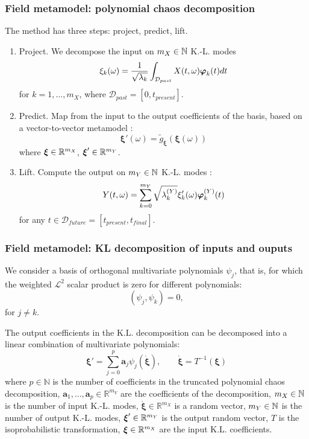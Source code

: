 \documentclass[10pt]{beamer}
\begin{document}
\begin{frame}
\frametitle{Field metamodel: polynomial chaos decomposition}

The method has three steps: project, predict, lift.
\begin{enumerate}
\item Project. We decompose the input on $m_X \in \mathbb{N}$ K.-L. modes 
$$
\xi_k(\omega) = \frac{1}{\sqrt{\lambda_k}} \int_{\mathcal{D}_{past}} X(t, \omega) {\boldsymbol \varphi}_k(t) dt
$$
for $k = 1, \ldots, m_X$, where $\mathcal{D}_{past} = [0, t_{present}]$.

\item Predict. Map from the input to the output coefficients of the basis, based 
on a vector-to-vector metamodel :
$$
\boldsymbol{\xi}'(\omega) = \tilde{g}_{\boldsymbol{\xi}} (\boldsymbol{\xi}(\omega))
$$
where $\boldsymbol{\xi} \in \mathbb{R}^{m_X}$, $\boldsymbol{\xi}' \in \mathbb{R}^{m_Y}$. 

\item Lift. Compute the output on $m_Y \in \mathbb{N}$ K.-L. modes :
$$
Y(t, \omega) = \sum_{k = 0}^{m_Y} \sqrt{\lambda^{(Y)}_k} \xi_k'(\omega) {\boldsymbol \varphi}^{(Y)}_k(t)
$$
for any $t \in \mathcal{D}_{future} = [t_{present}, t_{final}]$.

\end{enumerate}

\end{frame}


\begin{frame}
\frametitle{Field metamodel: KL decomposition of inputs and ouputs}

We consider a basis of orthogonal multivariate polynomials $\psi_j$, 
that is, for which the weighted $\mathcal{L}^2$ scalar product is 
zero for different polynomials:
$$
\left( \psi_j,\psi_k \right) = 0,
$$
for $j\neq k$.

The output coefficients in the K.L. decomposition 
can be decomposed into a linear combination of multivariate polynomials:
$$
\boldsymbol{\xi}' 
= \sum_{j = 0}^p \boldsymbol{a}_j\psi_j \left(\mathring{\boldsymbol{\xi}} \right),
\qquad \mathring{\boldsymbol{\xi}} = T^{-1}(\boldsymbol{\xi})
$$
where $p \in \mathbb{N}$ is the number of coefficients in the truncated polynomial 
chaos decomposition, $\boldsymbol{a}_1, \ldots, \boldsymbol{a}_p \in\mathbb{R}^{m_Y}$ are the coefficients of the 
decomposition, $m_X \in \mathbb{N}$ is the number of input K.-L. modes,  
$\mathring{\boldsymbol{\xi}} \in\mathbb{R}^{m_X}$ 
is a random vector, $m_Y \in \mathbb{N}$ is the number of output K.-L. modes,  
$\boldsymbol{\xi}' \in \mathbb{R}^{m_Y}$ 
is the output random vector, 
$T$ is the isoprobabilistic transformation, 
$\boldsymbol{\xi} \in \mathbb{R}^{m_X}$ are the input K.L. coefficients. 
\end{frame}
\end{document}
